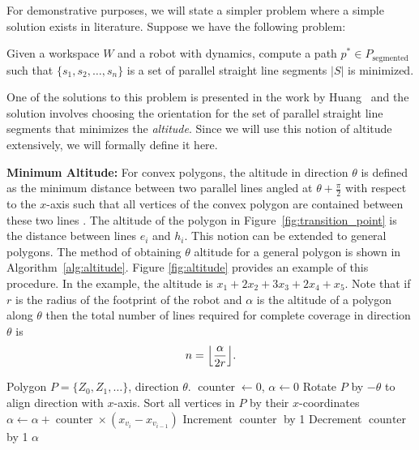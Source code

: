 \documentclass[../main.tex]{subfiles}
\begin{document}
For demonstrative purposes, we will state a simpler problem where a simple solution exists in literature. Suppose we have the following problem:
\begin{problem}
\label{problem:min_cost_cpp_with_parllel_lines}
	Given a workspace $W$ and a robot with dynamics, compute a path $p^*\in P_{\text{segmented}}$ such that $\{s_1,s_2,\dots,s_n\}$ is a set of parallel straight line segments $|S|$ is minimized.
\end{problem} 

One of the solutions to this problem is presented in the work by Huang~\cite{Huang2001optimal} and the solution involves choosing the orientation for the set of parallel straight line segments that minimizes the \emph{altitude}. Since we will use this notion of altitude extensively, we will formally define it here.

\textbf{Minimum Altitude:} For convex polygons, the altitude in direction $\theta$ is defined as the minimum distance between two parallel lines angled at $\theta+\frac{\pi}{2}$ with respect to the $x$-axis such that all vertices of the convex polygon are contained between these two lines \cite{Huang2001optimal}. The altitude of the polygon in Figure~\ref{fig:transition_point} is the distance between lines $e_i$ and $h_i$. This notion can be extended to general polygons. The method of obtaining $\theta$ altitude for a general polygon is shown in Algorithm~\ref{alg:altitude}. Figure \ref{fig:altitude} provides an example of this procedure. In the example, the altitude is $x_1 + 2x_2 + 3x_3 + 2x_4 + x_5$. Note that if $r$ is the radius of the footprint of the robot and $\alpha$ is the altitude of a polygon along $\theta$ then the total number of lines required for complete coverage in direction $\theta$ is
\begin{equation}
\begin{aligned}
 n=\floor*{\frac{\alpha}{2r}}.
\end{aligned}
\end{equation}

\begin{algorithm}
	\caption{$\operatorname{get\_general\_altitude}(P, \theta)$}
	\label{alg:altitude}
	\begin{algorithmic}[1]
		\REQUIRE Polygon $P=\{Z_0, Z_1,\ldots\}$, direction $\theta$.
			\STATE $\operatorname{counter}\gets 0$, $\alpha\gets 0$
			\STATE Rotate $P$ by $-\theta$ to align direction with $x$-axis.
			\STATE Sort all vertices in $P$ by their  $x$-coordinates
				\STATE $\alpha\gets \alpha+\operatorname{counter}\times(x_{v_{i}}-x_{v_{i-1}})$ 
					\STATE Increment $\operatorname{counter}$ by 1
					\STATE Decrement $\operatorname{counter}$ by 1
				\ENDIF
			\ENDFOR
			\RETURN $\alpha$
	\end{algorithmic}
\end{algorithm}
\end{document}
